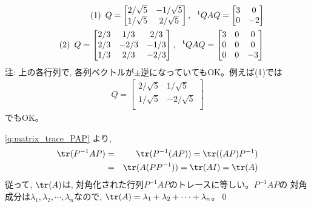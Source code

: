 \begin{eqnarray*}
&&\text(1)\,\,\,Q=\begin{bmatrix}
2/\sqrt{5} & -1/\sqrt{5}\\
1/\sqrt{5} & 2/\sqrt{5}\\
\end{bmatrix}, \,\,\,
\,^{\text t}Q AQ=\begin{bmatrix}
3 & 0\\
0 & -2\\
\end{bmatrix}\\
&&\text(2)\,\,\,Q=\begin{bmatrix}
2/3 &  1/3 &  2/3\\
2/3 & -2/3 & -1/3\\
1/3 &  2/3 & -2/3\\
\end{bmatrix}, \,\,\,
\,^{\text t}Q AQ=\begin{bmatrix}
3 & 0 & 0\\
0 & 0 & 0\\
0 & 0 & -3\\
\end{bmatrix}
\end{eqnarray*}
注: 上の各行列で, 各列ベクトルが$\pm$逆になっていてもOK。例えば(1)では
\begin{eqnarray*}
Q=\begin{bmatrix}
2/\sqrt{5} & 1/\sqrt{5}\\
1/\sqrt{5} & -2/\sqrt{5}\\
\end{bmatrix}
\end{eqnarray*}
でもOK。\mv

\ref{q:matrix_trace_PAP}
より, 
\begin{eqnarray*}
\tr(P^{-1}AP)&=&\tr(P^{-1}(AP))=\tr((AP)P^{-1})\\
&=&\tr(A(PP^{-1}))=\tr(AI)=\tr(A)
\end{eqnarray*}
従って, $\tr(A)$は, 対角化された行列$P^{-1}AP$のトレースに等しい。$P^{-1}AP$の
対角成分は$\lambda_1, \lambda_2, \cdots, \lambda_n$なので, 
$\tr(A)=\lambda_1+\lambda_2+\cdots+\lambda_n$。\qed
\mv

